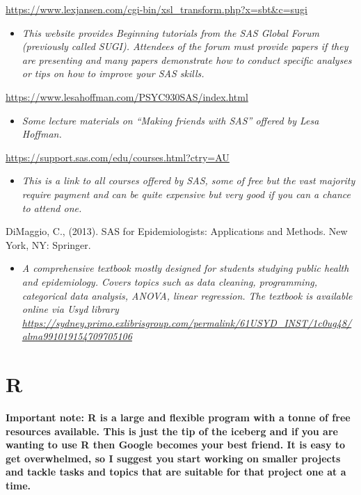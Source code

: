 \documentclass[
]{book}
\providecommand{\tightlist}{%
  \setlength{\itemsep}{0pt}\setlength{\parskip}{0pt}}
\begin{document}
\url{https://www.lexjansen.com/cgi-bin/xsl_transform.php?x=sbt\&c=sugi}

\begin{itemize}
\tightlist
\item
  \emph{This website provides Beginning tutorials from the SAS Global Forum (previously called SUGI). Attendees of the forum must provide papers if they are presenting and many papers demonstrate how to conduct specific analyses or tips on how to improve your SAS skills.}
\end{itemize}

\url{https://www.lesahoffman.com/PSYC930SAS/index.html}

\begin{itemize}
\tightlist
\item
  \emph{Some lecture materials on ``Making friends with SAS'' offered by Lesa Hoffman.}
\end{itemize}

\url{https://support.sas.com/edu/courses.html?ctry=AU}

\begin{itemize}
\tightlist
\item
  \emph{This is a link to all courses offered by SAS, some of free but the vast majority require payment and can be quite expensive but very good if you can a chance to attend one.}
\end{itemize}

DiMaggio, C., (2013). SAS for Epidemiologists: Applications and Methods. New York, NY: Springer.

\begin{itemize}
\tightlist
\item
  \emph{A comprehensive textbook mostly designed for students studying public health and epidemiology. Covers topics such as data cleaning, programming, categorical data analysis, ANOVA, linear regression. The textbook is available online via Usyd library \url{https://sydney.primo.exlibrisgroup.com/permalink/61USYD_INST/1c0ug48/alma991019154709705106}}
\end{itemize}

\hypertarget{r}{%
\section{R}\label{r}}

\textbf{Important note: R is a large and flexible program with a tonne of free resources available. This is just the tip of the iceberg and if you are wanting to use R then Google becomes your best friend. It is easy to get overwhelmed, so I suggest you start working on smaller projects and tackle tasks and topics that are suitable for that project one at a time. }
\end{document}
